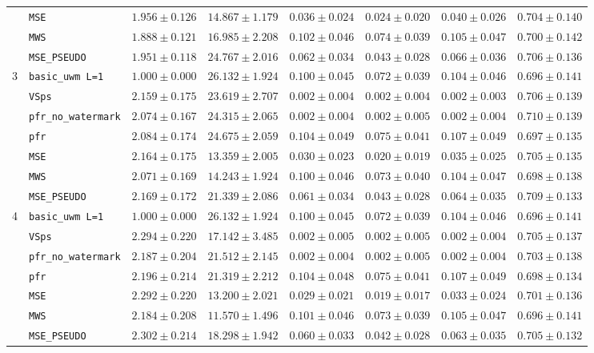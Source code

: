 \documentclass{article}
\theoremstyle{plain}
\theoremstyle{definition}
\begin{document}
\begin{table}[!htbp]
{\begin{tabular}{llcccccc}
 & \texttt{MSE} & $1.956 \pm 0.126$ & $14.867 \pm 1.179$ & $0.036 \pm 0.024$ & $0.024 \pm 0.020$ & $0.040 \pm 0.026$ & $0.704 \pm 0.140$ \\
 & \texttt{MWS} & $1.888 \pm 0.121$ & $16.985 \pm 2.208$ & $0.102 \pm 0.046$ & $0.074 \pm 0.039$ & $0.105 \pm 0.047$ & $0.700 \pm 0.142$ \\
 & \texttt{MSE\_PSEUDO} & $1.951 \pm 0.118$ & $24.767 \pm 2.016$ & $0.062 \pm 0.034$ & $0.043 \pm 0.028$ & $0.066 \pm 0.036$ & $0.706 \pm 0.136$ \\
\midrule
3 & \texttt{basic\_uwm L=1} & $1.000 \pm 0.000$ & $26.132 \pm 1.924$ & $0.100 \pm 0.045$ & $0.072 \pm 0.039$ & $0.104 \pm 0.046$ & $0.696 \pm 0.141$ \\
 & \texttt{VSps} & $2.159 \pm 0.175$ & $23.619 \pm 2.707$ & $0.002 \pm 0.004$ & $0.002 \pm 0.004$ & $0.002 \pm 0.003$ & $0.706 \pm 0.139$ \\
 & \texttt{pfr\_no\_watermark} & $2.074 \pm 0.167$ & $24.315 \pm 2.065$ & $0.002 \pm 0.004$ & $0.002 \pm 0.005$ & $0.002 \pm 0.004$ & $0.710 \pm 0.139$ \\
 & \texttt{pfr} & $2.084 \pm 0.174$ & $24.675 \pm 2.059$ & $0.104 \pm 0.049$ & $0.075 \pm 0.041$ & $0.107 \pm 0.049$ & $0.697 \pm 0.135$ \\
 & \texttt{MSE} & $2.164 \pm 0.175$ & $13.359 \pm 2.005$ & $0.030 \pm 0.023$ & $0.020 \pm 0.019$ & $0.035 \pm 0.025$ & $0.705 \pm 0.135$ \\
 & \texttt{MWS} & $2.071 \pm 0.169$ & $14.243 \pm 1.924$ & $0.100 \pm 0.046$ & $0.073 \pm 0.040$ & $0.104 \pm 0.047$ & $0.698 \pm 0.138$ \\
 & \texttt{MSE\_PSEUDO} & $2.169 \pm 0.172$ & $21.339 \pm 2.086$ & $0.061 \pm 0.034$ & $0.043 \pm 0.028$ & $0.064 \pm 0.035$ & $0.709 \pm 0.133$ \\
\midrule
4 & \texttt{basic\_uwm L=1} & $1.000 \pm 0.000$ & $26.132 \pm 1.924$ & $0.100 \pm 0.045$ & $0.072 \pm 0.039$ & $0.104 \pm 0.046$ & $0.696 \pm 0.141$ \\
 & \texttt{VSps} & $2.294 \pm 0.220$ & $17.142 \pm 3.485$ & $0.002 \pm 0.005$ & $0.002 \pm 0.005$ & $0.002 \pm 0.004$ & $0.705 \pm 0.137$ \\
 & \texttt{pfr\_no\_watermark} & $2.187 \pm 0.204$ & $21.512 \pm 2.145$ & $0.002 \pm 0.004$ & $0.002 \pm 0.005$ & $0.002 \pm 0.004$ & $0.703 \pm 0.138$ \\
 & \texttt{pfr} & $2.196 \pm 0.214$ & $21.319 \pm 2.212$ & $0.104 \pm 0.048$ & $0.075 \pm 0.041$ & $0.107 \pm 0.049$ & $0.698 \pm 0.134$ \\
 & \texttt{MSE} & $2.292 \pm 0.220$ & $13.200 \pm 2.021$ & $0.029 \pm 0.021$ & $0.019 \pm 0.017$ & $0.033 \pm 0.024$ & $0.701 \pm 0.136$ \\
 & \texttt{MWS} & $2.184 \pm 0.208$ & $11.570 \pm 1.496$ & $0.101 \pm 0.046$ & $0.073 \pm 0.039$ & $0.105 \pm 0.047$ & $0.696 \pm 0.141$ \\
 & \texttt{MSE\_PSEUDO} & $2.302 \pm 0.214$ & $18.298 \pm 1.942$ & $0.060 \pm 0.033$ & $0.042 \pm 0.028$ & $0.063 \pm 0.035$ & $0.705 \pm 0.132$ \\
\bottomrule
\end{tabular}
}
\end{table}
\end{document}
